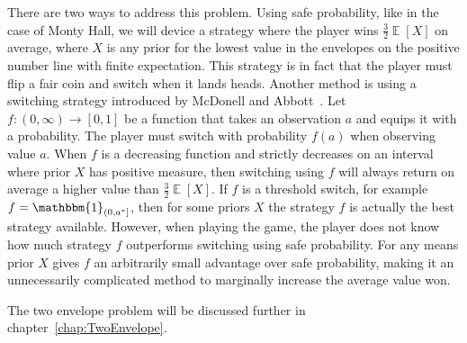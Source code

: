 \documentclass[twoside,a4paper]{report}
\theoremstyle{plain}
\theoremstyle{definition}
\theoremstyle{remark}
\numberwithin{equation}{chapter}
\DeclareMathOperator{\E}{\mathbb{E}}
\DeclareMathOperator{\1}{\mathbbm{1}}
\begin{document}
There are two ways to address this problem. Using safe probability, like in the case of Monty Hall, we will device a strategy where the player wins $\frac{3}{2}\E[X]$ on average, where $X$ is any prior for the lowest value in the envelopes on the positive number line with finite expectation. This strategy is in fact that the player must flip a fair coin and switch when it lands heads. Another method is using a switching strategy introduced by McDonell and Abbott~\cite{McDonnell09,Abbott10,McDonnell11}. Let $f\colon (0,\infty)\to[0,1]$ be a function that takes an observation $a$ and equips it with a probability. The player must switch with probability $f(a)$ when observing value $a$. When $f$ is a decreasing function and strictly decreases on an interval where prior $X$ has positive measure, then switching using $f$ will always return on average a higher value than $\frac{3}{2}\E[X]$. If $f$ is a threshold switch, for example $f=\1_{(0,a^*]}$, then for some priors $X$ the strategy $f$ is actually the best strategy available. However, when playing the game, the player does not know how much strategy $f$ outperforms switching using safe probability. For any means prior $X$ gives $f$ an arbitrarily small advantage over safe probability, making it an unnecessarily complicated method to marginally increase the average value won.

The two envelope problem will be discussed further in chapter~\ref{chap:TwoEnvelope}.


\begin{comment}
A third still unsolved problem is the Sleeping Beauty problem. In this problem Sleeping Beauty is willing to do an experiment. At Sunday she goes to sleep. A fair coin is tossed with the following results: Sleeping Beauty wakes on Monday with heads and wakes on Monday and Tuesday with tails. If she is awake, she must state her credence of the coin giving heads. After the question, she goes to sleep using an amnesia-inducing drug which makes her forget that she has waken before. At Wednesday she wakes and the experiment is over.

A first argument of the probability distribution of the coin is given by the halfers. When Sleeping Beauty wakes, she has no clue what day it is. She knows that the coin is fair and has no reason guess otherwise, thus she must say the the coin is still fair.\\
Another argument is given by the thirders. Namely that there are three possible events, namely awake on Monday and coin has heads, awake on Monday and coin has tails and as last awake on Tuesday and coin has tails. She does not know which event she attends, thus the events happen with uniform probability. There is one event with the coin giving heads, thus the probability of the coin having heads is 33\$.

I propose a solution that the thirders use a different model than the halfers. The question concerns the probability distribution of the coin, which remains 50\%. The thirders answer the question `what is the probability of guessing correctly if I guess that the coin landed heads', which is 33\%. This solution will be discussed with more depth in chapter~\ref{chap:SleepingBeauty}.
\end{comment}
\end{document}
